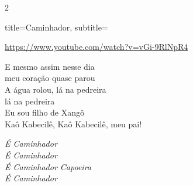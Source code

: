 \documentclass[fontsize=14pt, paper=a4, twoside, DIV=20]{scrreprt} %
\begin{document}
\begin{multicols*}{2}
\begin{song}{title={Caminhador}, subtitle={\begin{small}
        \url{https://www.youtube.com/watch?v=vGi-9RlNpR4}
\end{small}}}
\begin{verse*}
       E mesmo assim nesse dia\\
       meu coração quase parou\\
       A água rolou, lá na pedreira\\
       lá na pedreira\\
       Eu sou filho de Xangô\\
       Kaô Kabecilê, Kaô Kabecilê, meu pai!\\
    \end{verse*}

        \begin{chorus*}
            \textit{É Caminhador}\\
            \textit{É Caminhador}\\
            \textit{É Caminhador Capoeira}\\
            \textit{É Caminhador}\\
        \end{chorus*}
\end{song}



\end{multicols*}
\end{document}
